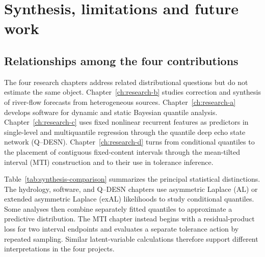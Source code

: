 \chapter{Synthesis, limitations and future work}
\label{ch:synthesis}

\section{Relationships among the four contributions}
\label{sec:synthesis-target-first}

The four research chapters address related distributional questions but do not
estimate the same object. Chapter~\ref{ch:research-b} studies correction and
synthesis of river-flow forecasts from heterogeneous sources.
Chapter~\ref{ch:research-a} develops software for dynamic and static Bayesian
quantile analysis. Chapter~\ref{ch:research-c} uses fixed nonlinear recurrent
features as predictors in single-level and multiquantile regression through
the quantile deep echo state network (Q--DESN).
Chapter~\ref{ch:research-d} turns from conditional quantiles to the placement
of contiguous fixed-content intervals through the mean-tilted interval (MTI)
construction and to their use in tolerance inference.

Table~\ref{tab:synthesis-comparison} summarizes the principal statistical
distinctions. The hydrology, software, and Q--DESN chapters use asymmetric
Laplace (AL) or extended asymmetric Laplace (exAL) likelihoods to study
conditional quantiles. Some analyses then combine separately fitted quantiles
to approximate a predictive distribution. The MTI chapter instead begins with
a residual-product loss for two interval endpoints and evaluates a separate
tolerance action by repeated sampling. Similar latent-variable calculations
therefore support different interpretations in the four projects.

